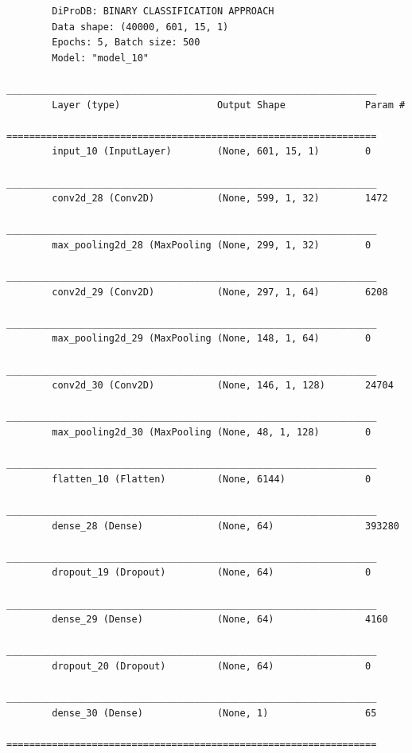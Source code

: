 \documentclass[10pt]{beamer}
\begin{document}
\begin{frame}[fragile]
	\tiny
	\begin{lstlisting}
		DiProDB: BINARY CLASSIFICATION APPROACH
		Data shape: (40000, 601, 15, 1)
		Epochs: 5, Batch size: 500
		Model: "model_10"
		_________________________________________________________________
		Layer (type)                 Output Shape              Param #   
		=================================================================
		input_10 (InputLayer)        (None, 601, 15, 1)        0         
		_________________________________________________________________
		conv2d_28 (Conv2D)           (None, 599, 1, 32)        1472      
		_________________________________________________________________
		max_pooling2d_28 (MaxPooling (None, 299, 1, 32)        0         
		_________________________________________________________________
		conv2d_29 (Conv2D)           (None, 297, 1, 64)        6208      
		_________________________________________________________________
		max_pooling2d_29 (MaxPooling (None, 148, 1, 64)        0         
		_________________________________________________________________
		conv2d_30 (Conv2D)           (None, 146, 1, 128)       24704     
		_________________________________________________________________
		max_pooling2d_30 (MaxPooling (None, 48, 1, 128)        0         
		_________________________________________________________________
		flatten_10 (Flatten)         (None, 6144)              0         
		_________________________________________________________________
		dense_28 (Dense)             (None, 64)                393280    
		_________________________________________________________________
		dropout_19 (Dropout)         (None, 64)                0         
		_________________________________________________________________
		dense_29 (Dense)             (None, 64)                4160      
		_________________________________________________________________
		dropout_20 (Dropout)         (None, 64)                0         
		_________________________________________________________________
		dense_30 (Dense)             (None, 1)                 65        
		=================================================================
		
	\end{lstlisting}
\end{frame}
\end{document}
